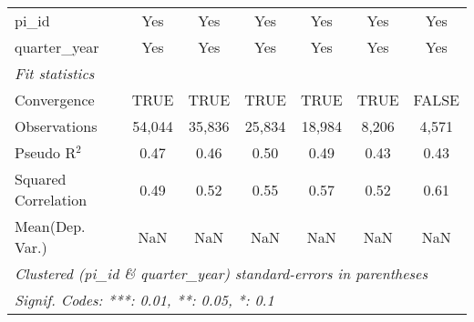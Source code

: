 \begin{tabular}{lcccccc}
   pi\_id                                                     & Yes           & Yes           & Yes           & Yes           & Yes          & Yes\\  
   quarter\_year                                              & Yes           & Yes           & Yes           & Yes           & Yes          & Yes\\  
   \midrule
   \emph{Fit statistics}\\
   Convergence                                                &TRUE           & TRUE          & TRUE          & TRUE          & TRUE         & FALSE\\  
   Observations                                               & 54,044        & 35,836        & 25,834        & 18,984        & 8,206        & 4,571\\  
   Pseudo R$^2$                                               & 0.47          & 0.46          & 0.50          & 0.49          & 0.43         & 0.43\\  
   Squared Correlation                                        & 0.49          & 0.52          & 0.55          & 0.57          & 0.52         & 0.61\\  
Mean(Dep. Var.) & NaN & NaN & NaN & NaN & NaN & NaN \\
   \midrule \midrule
   \multicolumn{7}{l}{\emph{Clustered (pi\_id \& quarter\_year) standard-errors in parentheses}}\\
   \multicolumn{7}{l}{\emph{Signif. Codes: ***: 0.01, **: 0.05, *: 0.1}}\\
\end{tabular}
\par\endgroup
